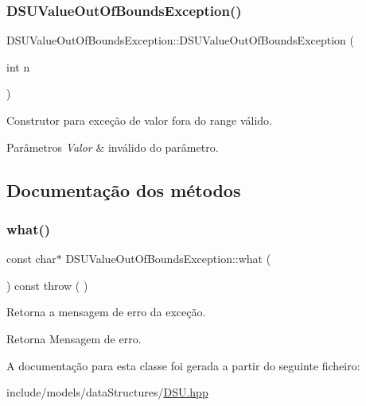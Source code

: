 \subsubsection{\texorpdfstring{DSUValueOutOfBoundsException()}{DSUValueOutOfBoundsException()}}
{\footnotesize\ttfamily D\+S\+U\+Value\+Out\+Of\+Bounds\+Exception\+::\+D\+S\+U\+Value\+Out\+Of\+Bounds\+Exception (\begin{DoxyParamCaption}\item[{int}]{n }\end{DoxyParamCaption})\hspace{0.3cm}{\ttfamily [inline]}}

Construtor para exceção de valor fora do range válido. 
\begin{DoxyParams}{Parâmetros}
{\em Valor} & inválido do parâmetro. \\
\hline
\end{DoxyParams}


\subsection{Documentação dos métodos}
\mbox{\label{classDSUValueOutOfBoundsException_a20697d2be588c4f19046c9f468675bde}} 
\subsubsection{\texorpdfstring{what()}{what()}}
{\footnotesize\ttfamily const char$\ast$ D\+S\+U\+Value\+Out\+Of\+Bounds\+Exception\+::what (\begin{DoxyParamCaption}{ }\end{DoxyParamCaption}) const throw ( ) \hspace{0.3cm}{\ttfamily [inline]}}

Retorna a mensagem de erro da exceção. \begin{DoxyReturn}{Retorna}
Mensagem de erro. 
\end{DoxyReturn}


A documentação para esta classe foi gerada a partir do seguinte ficheiro\+:\begin{DoxyCompactItemize}
\item 
include/models/data\+Structures/\mbox{\hyperlink{DSU_8hpp}{D\+S\+U.\+hpp}}\end{DoxyCompactItemize}
